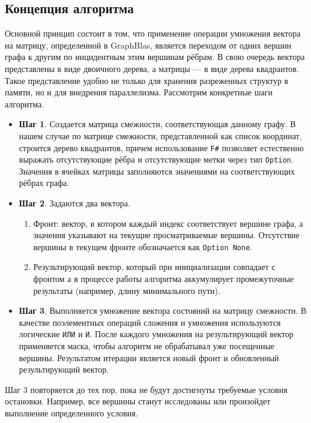 \subsection{Концепция алгоритма}
Основной принцип состоит в том, что применение операции умножения вектора на матрицу, определенной в GraphBlas, является переходом от одних вершин графа к другим по инцидентным этим вершинам рёбрам.
В свою очередь вектора представлены в виде двоичного дерева, а матрицы --- в виде дерева квадрантов. Такое представление удобно не только для хранения разреженных структур в памяти, но и для внедрения параллелизма. Рассмотрим конкретные шаги алгоритма.
\begin{itemize}
    \item \textbf{Шаг 1}. Создается матрица смежности, соответствующая данному графу. В нашем случае по матрице смежности, представленной как список координат, строится дерево квадрантов, причем использование \texttt{F\#} позволяет естественно выражать отсутствующие рёбра и отсутствующие метки через тип \texttt{Option}. Значения в ячейках матрицы заполняются значениями на соответствующих рёбрах графа.
    \item \textbf{Шаг 2}. Задаются два вектора.
    \begin{enumerate}
        \item Фронт: вектор, в котором каждый индекс соответствует вершине графа, а значения указывают на текущие просматриваемые вершины. Отсутствие вершины в текущем фронте обозначается как \texttt{Option None}.
        \item Результирующий вектор, который при инициализации совпадает с фронтом а в процессе работы алгоритма аккумулирует промежуточные результаты (например, длину минимального пути).
    \end{enumerate}
    \item \textbf{Шаг 3}. Выполняется умножение вектора состояний на матрицу смежности. В качестве поэлементных операций сложения и умножения используются логические \texttt{ИЛИ} и \texttt{И}. После каждого умножения на результирующий вектор применяется маска, чтобы алгоритм не обрабатывал уже посещенные вершины. Результатом итерации является новый фронт и обновленный результирующий вектор.
\end{itemize}

Шаг 3 повторяется до тех пор, пока не будут достигнуты требуемые условия остановки. Например, все вершины станут исследованы или произойдет выполнение определенного условия.

